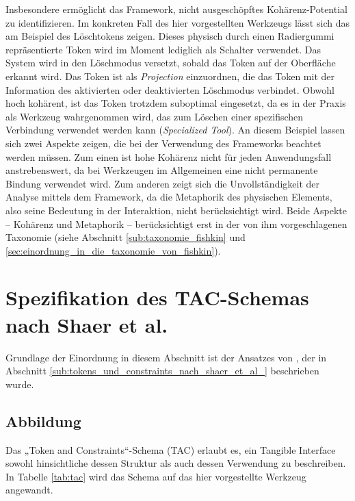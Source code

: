 Insbesondere ermöglicht das Framework, nicht ausgeschöpftes Kohärenz-Potential zu identifizieren. Im konkreten Fall des hier vorgestellten Werkzeugs lässt sich das am Beispiel des Löschtokens zeigen. Dieses physisch durch einen Radiergummi repräsentierte Token wird im Moment lediglich als Schalter verwendet. Das System wird in den Löschmodus versetzt, sobald das Token auf der Oberfläche erkannt wird. Das Token ist als \emph{Projection} einzuordnen, die das Token mit der Information des aktivierten oder deaktivierten Löschmodus verbindet. Obwohl hoch kohärent, ist das Token trotzdem suboptimal eingesetzt, da es in der Praxis als Werkzeug wahrgenommen wird, das zum Löschen einer spezifischen Verbindung verwendet werden kann (\emph{Specialized Tool}). An diesem Beispiel lassen sich zwei Aspekte zeigen, die bei der Verwendung des Frameworks beachtet werden müssen. Zum einen ist hohe Kohärenz nicht für jeden Anwendungsfall anstrebenswert, da bei Werkzeugen im Allgemeinen eine nicht permanente Bindung verwendet wird. Zum anderen zeigt sich die Unvollständigkeit der Analyse mittels dem Framework, da die Metaphorik des physischen Elements, also seine Bedeutung in der Interaktion, nicht berücksichtigt wird. Beide Aspekte -- Kohärenz und Metaphorik -- berücksichtigt erst \citep{Fishkin04} in der von ihm vorgeschlagenen Taxonomie (siehe Abschnitt \ref{sub:taxonomie_fishkin} und \ref{sec:einordnung_in_die_taxonomie_von_fishkin}).


\section{Spezifikation des TAC-Schemas nach Shaer et al.} %
\label{sec:spezifikation_des_tac_schemas_nach_shaer_et_al_}

Grundlage der Einordnung in diesem Abschnitt ist der Ansatzes von \citet{Shaer04}, der in Abschnitt \ref{sub:tokens_und_constraints_nach_shaer_et_al_} beschrieben wurde.

\subsection{Abbildung} %

Das „Token and Constraints“-Schema (TAC) erlaubt es, ein Tangible Interface sowohl hinsichtliche dessen Struktur als auch dessen Verwendung zu beschreiben. In Tabelle \ref{tab:tac} wird das Schema auf das hier vorgestellte Werkzeug angewandt. 


